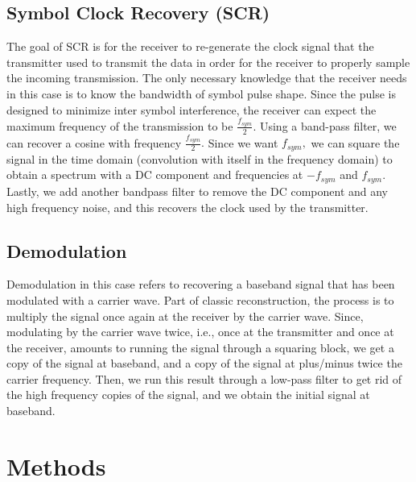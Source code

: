 \documentclass{article}
\begin{document}
\subsection{Symbol Clock Recovery (SCR)}
The goal of SCR is for the receiver to re-generate the clock signal that the transmitter used to transmit the data in order for the receiver to properly sample the incoming transmission. The only necessary knowledge that the receiver needs in this case is to know the bandwidth of symbol pulse shape. Since the pulse is designed to minimize inter symbol interference, the receiver can expect the maximum frequency of the transmission to be $ \frac{f_{sym}}{2}. $ Using a band-pass filter, we can recover a cosine with frequency $ \frac{f_{sym}}{2}. $ Since we want $ f_{sym}, $ we can square the signal in the time domain (convolution with itself in the frequency domain) to obtain a spectrum with a DC component and frequencies at $ - f_{sym} $ and $ f_{sym}.$ Lastly, we add another bandpass filter to remove the DC component and any high frequency noise, and this recovers the clock used by the transmitter.

\subsection{Demodulation}
Demodulation in this case refers to recovering a baseband signal that has been modulated with a carrier wave. Part of classic reconstruction, the process is to multiply the signal once again at the receiver by the carrier wave. Since, modulating by the carrier wave twice, i.e., once at the transmitter and once at the receiver, amounts to running the signal through a squaring block, we get a copy of the signal at baseband, and a copy of the signal at plus/minus twice the carrier frequency. Then, we run this result through a low-pass filter to get rid of the high frequency copies of the signal, and we obtain the initial signal at baseband.


\section{Methods}


\end{document}
